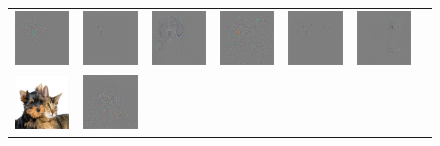 \begin{figure}
\begin{center}
\begin{tabular}{ccccccc}
\includegraphics[width=0.14\linewidth,height=0.11\linewidth]{figs/examples/googlenet/oxford/dog-cat2_diff_163} &
\includegraphics[width=0.14\linewidth,height=0.11\linewidth]{figs/examples/googlenet/deconv/dog-cat2_diff_163} &
\includegraphics[width=0.14\linewidth,height=0.11\linewidth]{figs/examples/googlenet/soft/dog-cat2_diff_163} &
\includegraphics[width=0.14\linewidth,height=0.11\linewidth]{figs/examples/googlenet/oxford/dog-cat2_diff_286} &
\includegraphics[width=0.14\linewidth,height=0.11\linewidth]{figs/examples/googlenet/deconv/dog-cat2_diff_286} &
\includegraphics[width=0.14\linewidth,height=0.11\linewidth]{figs/examples/googlenet/soft/dog-cat2_diff_286} \\
\vspace{-2.5pt}
\includegraphics[width=0.14\linewidth,height=0.11\linewidth]{figs/examples/googlenet/oxford/dog-cat3} &
\includegraphics[width=0.14\linewidth,height=0.11\linewidth]{figs/examples/googlenet/oxford/dog-cat3_diff_188} &

\end{tabular}
\end{center}
\end{figure}
